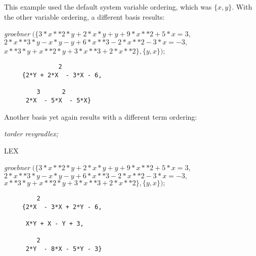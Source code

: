This example used the default system variable ordering, which was
$\{x,y\}$. With the other variable ordering, a different basis results:

{\it groebner} $(\{ 3*x**2*y + 2*x*y + y + 9*x**2 + 5*x = 3,$ \\
\hspace*{+1cm} $2*x**3*y - x*y - y + 6*x**3 - 2*x**2 - 3*x = -3,$ \\
\hspace*{+1cm} $x**3*y + x**2*y + 3*x**3 + 2*x**2 \}, \{y,x\})$;

\begin{verbatim}
               2
     {2*Y + 2*X  - 3*X - 6,

         3      2
      2*X  - 5*X  - 5*X}
\end{verbatim}

Another basis yet again results with a different term ordering:
\begin{center}
{\it torder revgradlex;}
\end{center}
LEX

{\it groebner} $(\{ 3*x**2*y + 2*x*y + y + 9*x**2 + 5*x = 3,$ \\
\hspace*{+1cm} $2*x**3*y - x*y - y + 6*x**3 - 2*x**2 - 3*x = -3,$ \\
\hspace*{+1cm}  $x**3*y + x**2*y + 3*x**3 + 2*x**2 \}, \{y,x\}); $

\begin{verbatim}
         2
     {2*X  - 3*X + 2*Y - 6,

      X*Y + X - Y + 3,

         2
      2*Y  - 8*X - 5*Y - 3}
\end{verbatim}


